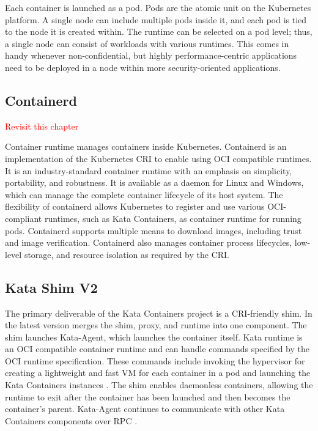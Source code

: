 Each container is launched as a pod. Pods are the atomic unit on the Kubernetes platform. A single node can include multiple pods inside it, and each pod is tied to the node it is created within. The runtime can be selected on a pod level; thus, a single node can consist of workloads with various runtimes. This comes in handy whenever non-confidential, but highly performance-centric applications need to be deployed in a node within more security-oriented applications.

\subsection{Containerd}
\textcolor{red}{Revisit this chapter}

Container runtime manages containers inside Kubernetes. Containerd is an implementation of the Kubernetes CRI to enable using OCI compatible runtimes. It is an industry-standard container runtime with an emphasis on simplicity, portability, and robustness. It is available as a daemon for Linux and Windows, which can manage the complete container lifecycle of its host system. The flexibility of containerd allows Kubernetes to register and use various OCI-compliant runtimes, such as Kata Containers, as container runtime for running pods. Containerd supports multiple means to download images, including trust and image verification. Containerd also manages container process lifecycles, low-level storage, and resource isolation as required by the CRI. \cite{containerdGithub}\cite{containerd}

\subsection{Kata Shim V2}

The primary deliverable of the Kata Containers project is a CRI-friendly shim. In the latest version merges the shim, proxy, and runtime into one component. The shim launches Kata-Agent, which launches the container itself. Kata runtime is an OCI compatible container runtime and can handle commands specified by the OCI runtime specification. These commands include invoking the hypervisor for creating a lightweight and fast VM for each container in a pod and launching the Kata Containers instances \cite{Randazzo2019}. The shim enables daemonless containers, allowing the runtime to exit after the container has been launched and then becomes the container's parent. Kata-Agent continues to communicate with other Kata Containers components over RPC \cite{KataContainersArchitecture}. \cite{Crosby}


